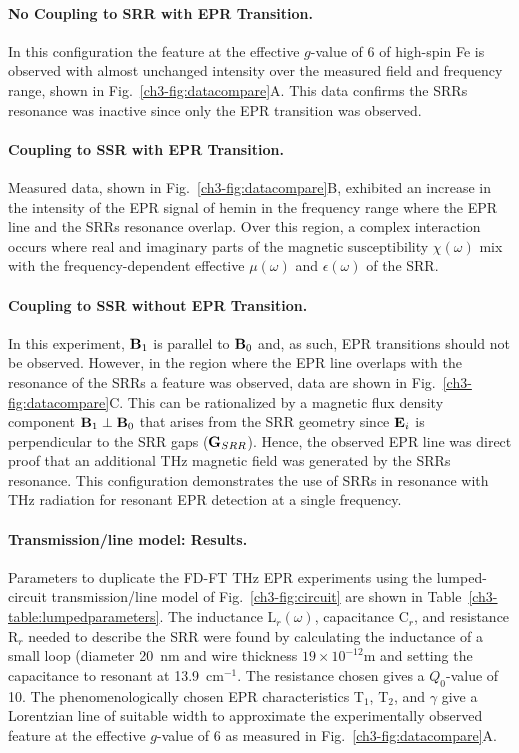 \noindent \paragraph*{No Coupling to SRR with EPR Transition.} In this configuration the feature at the effective $g$-value of 6 of high-spin Fe is observed with almost unchanged intensity over the measured field and frequency range, shown in Fig.~\ref{ch3-fig:datacompare}A. This data confirms the SRRs resonance was inactive since only the EPR transition was observed. 

\noindent \paragraph*{Coupling to SSR with EPR Transition.} Measured data, shown in Fig.~\ref{ch3-fig:datacompare}B, exhibited an increase in the intensity of the EPR signal of hemin in the frequency range where the EPR line and the SRRs resonance overlap. Over this region, a complex interaction occurs where real and imaginary parts of the magnetic susceptibility $\chi(\omega)$ mix with the frequency-dependent effective $\mu(\omega)$ and $\epsilon(\omega)$ of the SRR.

\noindent \paragraph*{Coupling to SSR without EPR Transition.} In this experiment, $\textbf{B}_{1}$ is parallel to $\textbf{B}_{0}$ and, as such, EPR transitions should not be observed. However, in the region where the EPR line overlaps with the resonance of the SRRs a feature was observed, data are shown in Fig.~\ref{ch3-fig:datacompare}C. This can be rationalized by a magnetic flux density component $\textbf{B}_{1}\perp\textbf{B}_{0}$ that arises from the SRR geometry since $\textbf{E}_{i}$ is perpendicular to the SRR gaps ($\textbf{G}_{SRR}$). Hence, the observed EPR line was direct proof that an additional THz magnetic field was generated by the SRRs resonance. This configuration demonstrates the use of SRRs in resonance with THz radiation for resonant EPR detection at a single frequency. 

\noindent \paragraph*{Transmission\-/line model: Results.} Parameters to duplicate the FD-FT THz EPR experiments using the lumped-circuit transmission\-/line model of Fig.~\ref{ch3-fig:circuit} are shown in Table~\ref{ch3-table:lumpedparameters}. The inductance L$_r(\omega)$, capacitance C$_r$, and resistance R$_r$ needed to describe the SRR were found by calculating the inductance of a small loop (diameter 20~nm and wire thickness $19 \times 10^{-12}$m and setting the capacitance to resonant at 13.9~cm$^{-1}$. The resistance chosen gives a $Q_0$-value of 10. The phenomenologically chosen EPR characteristics T$_1$, T$_2$, and $\gamma$ give a Lorentzian line of suitable width to approximate the experimentally observed feature at the effective $g$-value of 6 as measured in Fig.~\ref{ch3-fig:datacompare}A. 

